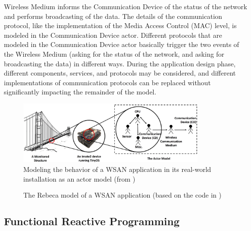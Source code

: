 \documentclass[
graybox,
envcountchap
]{svmult}
\begin{document}
\begin{bibunit}
Wireless Medium  informs the Communication Device of the status of the network and performs broadcasting of the data.
%
The details of the communication protocol, like the implementation of the Media Access Control (MAC) level, is modeled in the Communication Device actor.
Different protocols that are modeled in the Communication Device actor basically trigger the two events of the Wireless Medium (asking for the status of the network, and asking for broadcasting the data) in different ways.
%
During the application design phase, different components, services, and protocols may be considered, and different implementations of communication protocols can be replaced without significantly impacting the remainder of the model. 



\begin{figure}
\centering
\includegraphics[width=0.85\textwidth]{assets/TinyOS}
\caption{Modeling the behavior of a WSAN application in its real-world installation as an actor model 
(from \cite{DBLP:journals/sttt/KhamespanahSMA18})}
\label{fig::WSAN-actor-model}
\end{figure}

\begin{center}
\begin{figure}

\caption{The Rebeca model of a WSAN application (based on the code in \cite{DBLP:journals/sttt/KhamespanahSMA18})}
\label{fig::wsan-model}
\end{figure}
\end{center}

\subsection{Functional Reactive Programming}


\end{bibunit}
\end{document}
